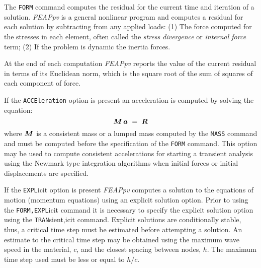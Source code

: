  \\{\smallskip}
 \\{\smallskip}
\headb

The {\tt FORM} command computes the residual for the  current
time and iteration of a solution.  {\sl FEAPpv} is a general nonlinear
program and computes a residual for each solution by subtracting
from any applied loads: (1) The force computed for
the stresses in each element, often called the {\it stress divergence}
or {\it internal force} term; (2) If the problem is dynamic the
inertia forces.

At the end of each computation {\sl FEAPpv} reports the value
of the current residual in terms of its Euclidean norm,
which is the square root of the sum of squares of each component
of force.

If the {\tt ACCEleration} option is present an acceleration is computed by
solving the equation:
\begin{equation}
\boldsymbol{M} \, \boldsymbol{a} \ = \ \boldsymbol{R}
\end{equation}
where $\boldsymbol{M}$ is a consistent mass or a lumped
mass computed by the {\tt MASS} command
and must be computed before the specification
of the {\tt FORM} command.  This option may be used to compute
consistent accelerations for starting a transient
analysis using the Newmark type integration algorithms when
initial forces or initial displacements are specified.

If the {\tt EXPL}icit option is present {\sl FEAPpv} computes a solution to
the equations of motion (momentum equations) using an explicit
solution option.  Prior to using the {\tt FORM,\-EXPL}icit command
it is necessary to specify the explicit solution option using
the {\tt TRAN}sient,icit command.
Explicit solutions are conditionally
stable, thus, a critical time step must be estimated
before attempting a solution.  An estimate to the critical
time step may be obtained using the maximum wave speed in
the material, $c$, and the closest spacing between nodes, $h$.
The maximum time step used must be less or equal to $h/c$.
\vfill\eject
